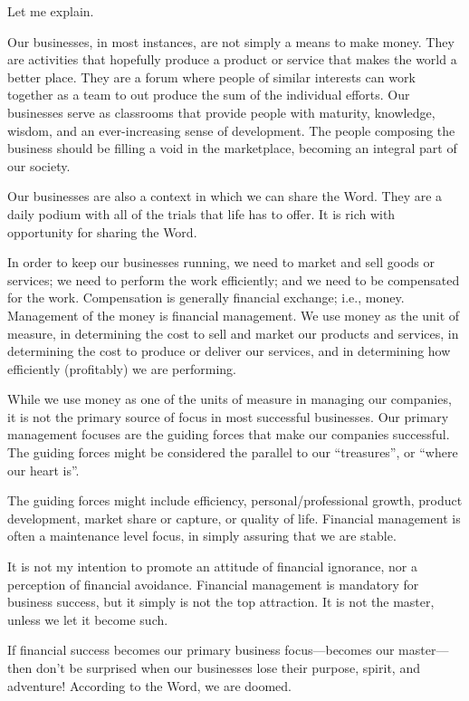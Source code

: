 \documentclass[12pt]{memoir}
\begin{document}
Let me explain.

Our businesses, in most instances, are not simply a means to make
money. They are activities that hopefully produce a product or service
that makes the world a better place. They are a forum where people
of similar interests can work together as a team to out produce the
sum of the individual efforts. Our businesses serve as classrooms that provide people with maturity, knowledge, wisdom, and an ever-increasing sense of development. The people composing the business should be
filling a void in the marketplace, becoming an integral part of our society.

Our businesses are also a context in which we can share the Word. They are a daily podium with all of the trials that life has to offer. It is rich with opportunity for sharing the Word.

In order to keep our businesses running, we need to market and sell
goods or services; we need to perform the work efficiently; and we need to be compensated for the work. Compensation is generally financial exchange; i.e., money. Management of the money is financial
management. We use money as the unit of measure, in determining the
cost to sell and market our products and services, in determining
the cost to produce or deliver our services, and in determining how efficiently (profitably) we are performing. 

While we use money as one of the units of measure in managing our
companies, it is not the primary source of focus in most successful
businesses. Our primary management focuses are the guiding forces that make our companies successful. The guiding forces might be considered the parallel to our ``treasures'', or ``where our heart is''.

The guiding forces might include efficiency, personal\slash{}professional
growth, product development, market share or capture, or quality of life. Financial management is often a maintenance level focus, in simply assuring that we are stable.

It is not my intention to promote an attitude of financial ignorance, nor a perception of financial
avoidance. Financial management is mandatory for business success,
but it simply is not the top attraction. It is not the master,
unless we let it become such.

If financial success becomes our primary business focus---becomes our master---then don't be surprised when
our businesses lose their purpose, spirit, and adventure! According to the Word, we are doomed.
\end{document}
